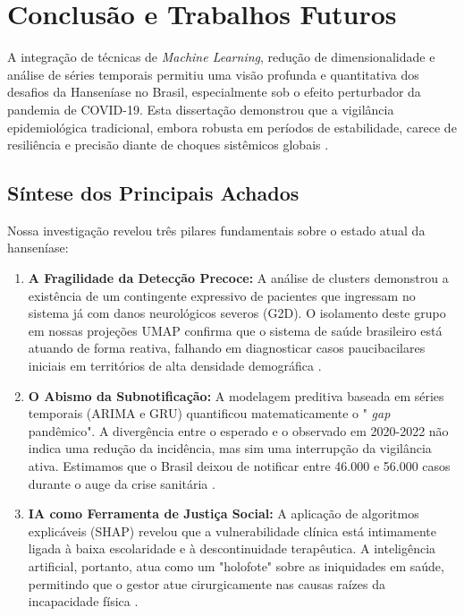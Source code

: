 \chapter{Conclusão e Trabalhos Futuros}


A integração de técnicas de \textit{Machine Learning}, redução de dimensionalidade e análise de séries temporais permitiu uma visão profunda e quantitativa dos desafios da Hanseníase no Brasil, especialmente sob o efeito perturbador da pandemia de COVID-19. Esta dissertação demonstrou que a vigilância epidemiológica tradicional, embora robusta em períodos de estabilidade, carece de resiliência e precisão diante de choques sistêmicos globais \cite{sousa2024predicting, frade2022hidden}.

\section{Síntese dos Principais Achados}

Nossa investigação revelou três pilares fundamentais sobre o estado atual da hanseníase:
\begin{enumerate}
    \item \textbf{A Fragilidade da Detecção Precoce:} A análise de clusters demonstrou a existência de um contingente expressivo de pacientes que ingressam no sistema já com danos neurológicos severos (G2D). O isolamento deste grupo em nossas projeções UMAP confirma que o sistema de saúde brasileiro está atuando de forma reativa, falhando em diagnosticar casos paucibacilares iniciais em territórios de alta densidade demográfica \cite{boletim2025hanseniase, who_hans_2021}.
    \item \textbf{O Abismo da Subnotificação:} A modelagem preditiva baseada em séries temporais (ARIMA e GRU) quantificou matematicamente o " \textit{gap} pandêmico". A divergência entre o esperado e o observado em 2020-2022 não indica uma redução da incidência, mas sim uma interrupção da vigilância ativa. Estimamos que o Brasil deixou de notificar entre 46.000 e 56.000 casos durante o auge da crise sanitária \cite{sousa2025, impact_minas_2025}.
    \item \textbf{IA como Ferramenta de Justiça Social:} A aplicação de algoritmos explicáveis (SHAP) revelou que a vulnerabilidade clínica está intimamente ligada à baixa escolaridade e à descontinuidade terapêutica. A inteligência artificial, portanto, atua como um "holofote" sobre as iniquidades em saúde, permitindo que o gestor atue cirurgicamente nas causas raízes da incapacidade física \cite{freitas2025evaluating, clinical_variables_northeast}.
\end{enumerate}

